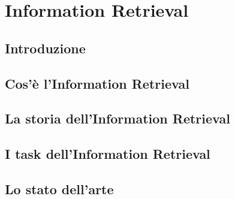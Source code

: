\chapter{Information Retrieval}
\label{Information_Retrieval}
\section{Introduzione}
\label{Information_Retrieval:Introduzione}
\section{Cos'è l'Information Retrieval}
\section{La storia dell'Information Retrieval}
\section{I task dell'Information Retrieval}
\section{Lo stato dell'arte}